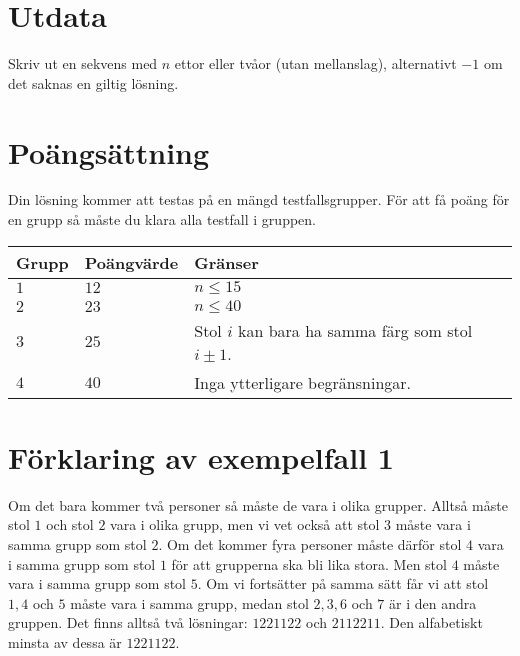 \section*{Utdata}
Skriv ut en sekvens med $n$ ettor eller tvåor (utan mellanslag), alternativt $-1$ om det saknas en giltig lösning.

\section*{Poängsättning}
Din lösning kommer att testas på en mängd testfallsgrupper.
För att få poäng för en grupp så måste du klara alla testfall i gruppen.

\noindent
\begin{tabular}{| l | l | l |}
  \hline
  Grupp & Poängvärde & Gränser \\ \hline
  $1$     & $12$         & $n \leq 15$\\ \hline
  $2$     & $23$         & $n \leq 40$ \\ \hline
  $3$     & $25$         & Stol $i$ kan bara ha samma färg som stol $i\pm 1$. \\ \hline
  $4$     & $40$         & Inga ytterligare begränsningar. \\ \hline
\end{tabular}

\section*{Förklaring av exempelfall 1}
Om det bara kommer två personer så måste de vara i olika grupper.
Alltså måste stol $1$ och stol $2$ vara i olika grupp, men vi vet också att stol $3$
måste vara i samma grupp som stol $2$. Om det kommer fyra personer måste därför stol $4$
vara i samma grupp som stol $1$ för att grupperna ska bli lika stora. Men stol $4$ måste
vara i samma grupp som stol $5$. Om vi fortsätter på samma sätt får vi att stol $1, 4$
och $5$ måste vara i samma grupp, medan stol $2, 3, 6$ och $7$ är i den andra gruppen.
Det finns alltså två lösningar: $1221122$ och $2112211$. Den alfabetiskt minsta av
dessa är $1221122$.
